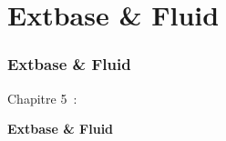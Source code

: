 %

\section{Extbase \& Fluid}
\begin{frame}[fragile]
	\frametitle{Extbase \& Fluid}

	\begin{center}\huge{Chapitre 5~:}\end{center}
	\begin{center}\huge{\color{typo3darkgrey}\textbf{Extbase \& Fluid}}\end{center}

\end{frame}


